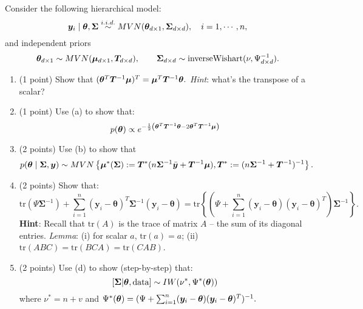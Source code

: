 \documentclass{article}
\newcommand{\bSigma}{\boldsymbol{\Sigma}}
\begin{document}
\begin{enumerate}
Consider the following hierarchical model:
\[ \bm{y}_i \mid \btheta,\bSigma \stackrel{i.i.d.}{\sim} MVN(\btheta_{d \times 1},\bSigma_{d \times d}), \quad i = 1, \cdots, n, \]
and independent priors $$\btheta_{d \times 1} \sim MVN(\bmu_{d \times 1},\bm{T}_{d \times d}), 
\qquad \bSigma_{d \times d} \sim \text{inverseWishart}(\nu, \Psi^{-1}_{d \times d}).$$
\begin{enumerate}
\item (1 point) Show that $({\bm\theta}^T \bm{T}^{-1} \bm{\mu})^T = \bm{\mu}^T \bm{T}^{-1} {\bm\theta}.$
\textit{Hint}: what's the transpose of a scalar?
\item (1 point) Use (a) to show that:
\[ p({\bm\theta}) \propto e^{-\frac{1}{2}\left({\bm\theta}^T\bm{T}^{-1}{\bm\theta} - 2{\bm\theta}^T \bm{T}^{-1} \bm{\mu} \right)} \]
\item (2 points) Use (b) to show that
$$ p(\btheta \mid \bSigma, \bm{y} )
\sim MVN\left\{\bmu^*(\bSigma) := {\bm{T}^*}(n \boldsymbol{\Sigma}^{-1}\bar{\bm{y}} + \bm{T}^{-1}\bmu), \bm{T}^* := ( n\boldsymbol{\Sigma}^{-1} + \bm{T}^{-1})^{-1}\right\}. $$
\item (2 points) Show that:
\[ \text{tr}(\Psi\boldsymbol{\Sigma}^{-1})+\sum_{i=1}^n (\bm{y}_i-\boldsymbol{\theta})^T \boldsymbol{\Sigma}^{-1}(\bm{y}_i-\boldsymbol{\theta}) = \text{tr}\left\{\left(\Psi + \sum_{i=1}^n (\bm{y}_i-\boldsymbol{\theta}) (\bm{y}_i-\boldsymbol{\theta})^T \right) \boldsymbol{\Sigma}^{-1}\right\}.\]
\textbf{Hint}: Recall that $\text{tr}(A)$ is the trace of matrix $A$ -- the sum of its diagonal entries. \textit{Lemma}: (i) for scalar $a$, $\text{tr}(a)=a$; (ii) $\text{tr}(ABC) = \text{tr}(BCA) = \text{tr}(CAB)$.
\item (2 points) Use (d) to show (step-by-step) that:
\[ [\bSigma|\btheta,\text{data}] \sim IW(\nu^*, \Psi^*(\btheta))\]
where $\nu^* = n + v$ and $\Psi^*({\bm\theta}) = (\Psi + \sum_{i=1}^n (\bm{y}_i-\boldsymbol{\theta}) (\bm{y}_i-\boldsymbol{\theta})^T)^{-1} .$
\end{enumerate}
\end{enumerate}
\end{document}
